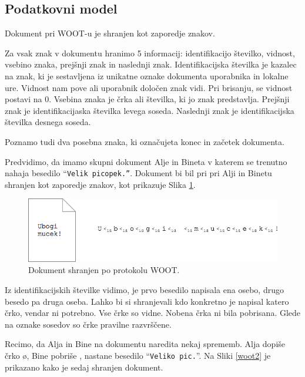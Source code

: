 \documentclass[a4paper, 12pt, twoside]{book}
\begin{document}
\subsection{Podatkovni model}

Dokument pri WOOT-u je shranjen kot zaporedje znakov.

Za vsak znak v dokumentu hranimo 5 informacij: identifikacijo številko, vidnost, vsebino znaka, prejšnji znak in naslednji znak. Identifikacijska številka je kazalec na znak, ki je sestavljena iz unikatne oznake dokumenta uporabnika in lokalne ure. Vidnost nam pove ali uporabnik določen znak vidi. Pri brisanju, se vidnost postavi na 0. Vsebina znaka je črka ali številka, ki jo znak predstavlja. Prejšnji znak je identifikacijaska številka levega soseda. Naslednji znak je identifikacijska številka desnega soseda.

Poznamo tudi dva posebna znaka, ki označujeta konec in začetek dokumenta.

Predvidimo, da imamo skupni dokument Alje in Bineta v katerem se trenutno nahaja besedilo “{\tt Velik picopek.”}. Dokument bi bil pri pri Alji in Binetu shranjen kot zaporedje znakov, kot prikazuje Slika \ref{woot1}.

\begin{figure}[placement h]
\begin{center}
\includegraphics[width=16cm]{woot1.png}
\end{center}
\caption{Dokument shranjen po protokolu WOOT.}
\label{woot1}
\end{figure}

Iz identifikacijskih številke vidimo, je prvo besedilo napisala ena osebo, drugo besedo pa druga oseba. Lahko bi si shranjevali kdo konkretno je napisal katero črko, vendar ni potrebno. Vse črke so vidne. Nobena črka ni bila pobrisana. Glede na oznake sosedov so črke pravilne razvrščene.

Recimo, da Alja in Bine na dokumentu naredita nekaj sprememb. Alja dopiše črko {\o}, Bine pobriše {\opek}, nastane besedilo “{\tt Veliko pic.}”. Na Sliki \ref{woot2} je prikazano kako je sedaj shranjen dokument.
\end{document}
